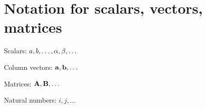 \section{Notation for scalars, vectors, matrices}

Scalars: $a,b,\ldots,\alpha,\beta,\ldots$

Column vectors: $\mathbf{a},\mathbf{b},\ldots$

Matrices: $\mathbf{A},\mathbf{B},\ldots$ 

Natural numbers: $i,j,\ldots$ 












